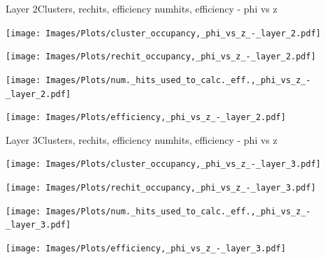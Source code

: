 \documentclass{beamer}
\begin{document}
\begin{frame}{Layer 2}{Clusters, rechits, efficiency numhits, efficiency - phi vs z}
  \hspace{0.01\textwidth}%
  \begin{minipage}{0.45\textwidth}
    \centering
    \texttt{[image: Images/Plots/cluster\_occupancy,\_phi\_vs\_z\_-\_layer\_2.pdf]}
  \end{minipage}%
  \hspace{0.01\textwidth}%
  \begin{minipage}{0.45\textwidth}
    \centering
    \texttt{[image: Images/Plots/rechit\_occupancy,\_phi\_vs\_z\_-\_layer\_2.pdf]}
  \end{minipage}
  \vspace*{0.2cm}
  \begin{minipage}{0.45\textwidth}
    \centering
    \texttt{[image: Images/Plots/num.\_hits\_used\_to\_calc.\_eff.,\_phi\_vs\_z\_-\_layer\_2.pdf]}
  \end{minipage}%
  \hspace{0.01\textwidth}%
  \begin{minipage}{0.45\textwidth}
    \centering
    \texttt{[image: Images/Plots/efficiency,\_phi\_vs\_z\_-\_layer\_2.pdf]}
  \end{minipage}
\end{frame}

\begin{frame}{Layer 3}{Clusters, rechits, efficiency numhits, efficiency - phi vs z}
  \hspace{0.01\textwidth}%
  \begin{minipage}{0.45\textwidth}
    \centering
    \texttt{[image: Images/Plots/cluster\_occupancy,\_phi\_vs\_z\_-\_layer\_3.pdf]}
  \end{minipage}%
  \hspace{0.01\textwidth}%
  \begin{minipage}{0.45\textwidth}
    \centering
    \texttt{[image: Images/Plots/rechit\_occupancy,\_phi\_vs\_z\_-\_layer\_3.pdf]}
  \end{minipage}
  \vspace*{0.2cm}
  \begin{minipage}{0.45\textwidth}
    \centering
    \texttt{[image: Images/Plots/num.\_hits\_used\_to\_calc.\_eff.,\_phi\_vs\_z\_-\_layer\_3.pdf]}
  \end{minipage}%
  \hspace{0.01\textwidth}%
  \begin{minipage}{0.45\textwidth}
    \centering
    \texttt{[image: Images/Plots/efficiency,\_phi\_vs\_z\_-\_layer\_3.pdf]}
  \end{minipage}
\end{frame}
\end{document}
